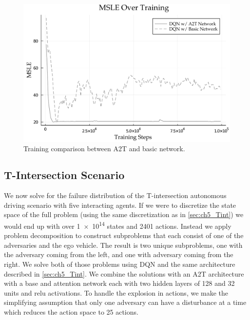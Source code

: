 \begin{figure}
        \centering
        \includegraphics[width=\textwidth]{figures/problem_decomposition/training_comparison.pdf}
        \caption{Training comparison between A2T and basic network.}
        \label{fig:ch6_adv_gridworld_training}
\end{figure}


\subsection{T-Intersection Scenario}

We now solve for the failure distribution of the T-intersection autonomous driving scenario with five interacting agents. If we were to discretize the state space of the full problem (using the same discretization as in \cref{sec:ch5_Tint}) we would end up with over \num{1e14} states and \num{2401} actions. Instead we apply problem decomposition to construct subproblems that each consist of one of the adversaries and the ego vehicle. The result is two unique subproblems, one with the adversary coming from the left, and one with adversary coming from the right. We solve both of those problems using DQN and the same architecture described in \cref{sec:ch5_Tint}. We combine the solutions with an A2T architecture with a base and attention network each with two hidden layers of \num{128} and \num{32} units and relu activations. To handle the explosion in actions, we make the simplifying assumption that only one adversary can have a disturbance at a time which reduces the action space to \num{25} actions.  

